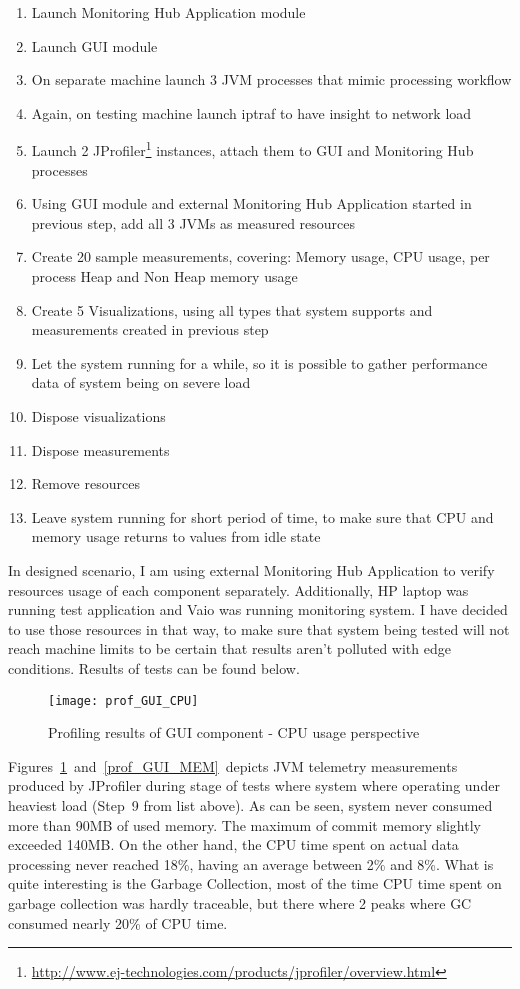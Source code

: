 \begin{enumerate}
\item Launch Monitoring Hub Application module
\item Launch GUI module
\item On separate machine launch 3 JVM processes that mimic processing workflow
\item Again, on testing machine launch iptraf to have insight to network load
\item Launch 2 JProfiler\footnote{\url{http://www.ej-technologies.com/products/jprofiler/overview.html}} instances, attach them to GUI and Monitoring Hub processes
\item Using GUI module and external Monitoring Hub Application started in previous step, add all 3 JVMs as measured resources
\item Create 20 sample measurements, covering: Memory usage, CPU usage, per process Heap and Non Heap memory usage
\item Create 5 Visualizations, using all types that system supports and measurements created in previous step
\item Let the system running for a while, so it is possible to gather performance data of system being on severe load
\item Dispose visualizations
\item Dispose measurements
\item Remove resources
\item Leave system running for short period of time, to make sure that CPU and memory usage returns to values from idle state
\end{enumerate}

In designed scenario, I am using external Monitoring Hub Application to verify resources usage of each component separately. Additionally, HP laptop was running test application and Vaio was running monitoring system. I have decided to use those resources in that way, to make sure that system being tested will not reach machine limits to be certain that results aren\rq{}t polluted with edge conditions. Results of tests  can be found below.


\begin{figure}[ht]
  \centering
  \texttt{[image: prof\_GUI\_CPU]}
  \caption{Profiling results of GUI component - CPU usage perspective}
  \label{fig:prof_GUI_CPU}
\end{figure}

Figures~\ref{fig:prof_GUI_CPU}~and~\ref{prof_GUI_MEM}~depicts JVM telemetry measurements produced by JProfiler during stage of tests where system where operating under heaviest load (Step~9 from list above). As can be seen, system never consumed more than 90MB of used memory. The maximum of commit memory slightly exceeded 140MB. On the other hand, the CPU time spent on actual data processing  never reached 18\%, having an average between 2\% and 8\%. What is quite interesting is the Garbage Collection, most of the time CPU time spent on garbage collection was hardly traceable, but there where 2 peaks where GC consumed nearly 20\% of CPU time. 


